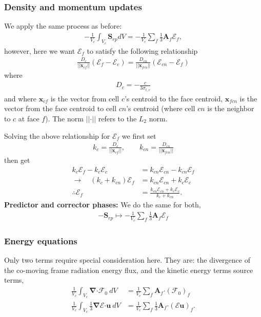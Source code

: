 \documentclass[10pt,letterpaper,notitlepage]{article}
\numberwithin{equation}{section}
\newcommand{\bnabla}{\boldsymbol{\nabla}}
\newcommand{\position}{\mathbf{x}}
\newcommand{\velocity}{\mathbf{u}}
\newcommand{\dotp}{\boldsymbol{\cdot}}
\newcommand{\RadE}{\mathcal{E}}
\newcommand{\RadF}{\boldsymbol{\mathcal{F}}}
\newcommand{\RadJ}{\RadF_0}
\newcommand{\AreaVec}{\mathbf{A}}
\newcommand{\beq}{\begin{equation*} \begin{aligned}}
\newcommand{\eeq}{\end{aligned}\end{equation*}}
\newcommand{\beqn}{\begin{equation}\begin{aligned}}
\newcommand{\eeqn}{\end{aligned}\end{equation}}
\begin{document}
\newpage
\subsubsection{Density and momentum updates} 
\label{section:fv_density_momentum_update}
We apply the same process as before:
\beqn 
-\frac{1}{V_c} \int_{V_c} \mathbf{S}_{rp} dV = -\frac{1}{V_c}  \sum_f \frac{1}{3} \AreaVec_f \RadE_f,
\eeqn 
however, here we want $\RadE_f$ to satisfy the following relationship
\beqn 
\frac{D_c}{||\position_{cf}||} (\RadE_f - \RadE_c) = 
\frac{D_{cn}}{||\position_{fcn}||} (\RadE_{cn} - \RadE_f) 
\eeqn 
where
\beqn 
D_c = -\frac{c}{3\sigma_{t,c}}
\eeqn 
and where $\position_{cf}$ is the vector from cell $c$'s centroid to the face centroid, $\position_{fcn}$ is the vector from the face centroid to cell $cn$'s centroid (where cell $cn$ is the neighbor to $c$ at face $f$). The norm $||\dotp||$ refers to the $L_2$ norm.

Solving the above relationship for $\RadE_f$ we first set
\beq 
k_c = \frac{D_c}{||\position_{cf}||} , \quad \quad
k_{cn} = \frac{D_{cn}}{||\position_{fcn}||}
\eeq 
then get
\beqn 
k_c \RadE_f - k_c \RadE_c &= k_{cn}  \RadE_{cn} - k_{cn}  \RadE_f \\
\to \quad 
(k_c + k_{cn} ) \RadE_f &= k_{cn}  \RadE_{cn} + k_c \RadE_c \\
\therefore
\RadE_f &= \frac{k_{cn}  \RadE_{cn} + k_c \RadE_c}{k_c +k_{cn} } .
\eeqn 
\newline
\newline 
\textbf{Predictor and corrector phases:} \newline 
We do the same for both,
\beqn
-\mathbf{S}_{rp} \mapsto  -\frac{1}{V_c}  \sum_f  \frac{1}{3} \AreaVec_f \RadE_f
\eeqn



\subsubsection{Energy equations}
\label{section:fv_energy_equations}
Only two terms require special consideration here. They are: the divergence of the co-moving frame radiation energy flux, and the kinetic energy terms source terms,
\beqn 
\frac{1}{V_c} \int_{V_c} \bnabla \dotp \RadJ \ dV &= \frac{1}{V_c} \sum_f \AreaVec_f \dotp (\RadJ)_f \\
\frac{1}{V_c} \int_{V_c} \frac{1}{3} \bnabla \RadE \dotp \velocity \ dV &= \frac{1}{V_c} \sum_f \frac{1}{3} \AreaVec_f \dotp (\RadE \velocity)_f.
\eeqn 
\end{document}
